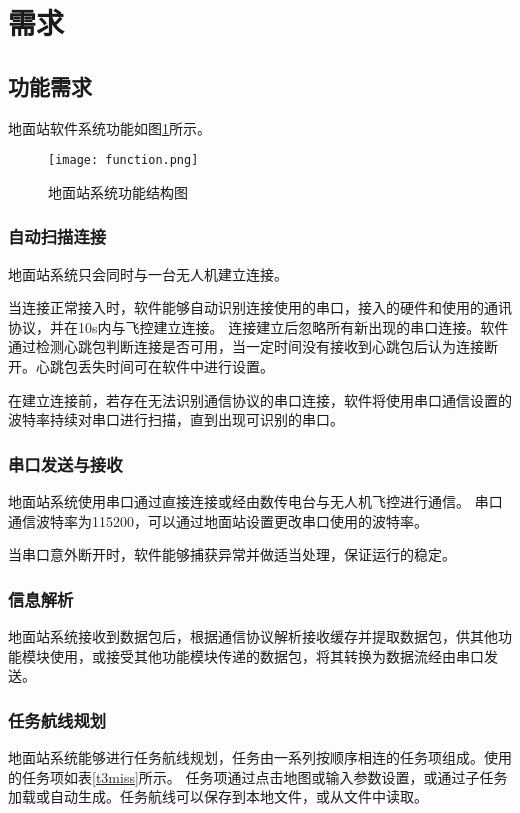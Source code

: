 \section{需求}
\subsection{功能需求}
\label{c31}
地面站软件系统功能如图\ref{f3fun}所示。
\begin{figure}[ht]
	\begin{center}
		\texttt{[image: function.png]}
		\caption{地面站系统功能结构图}
		\label{f3fun}
	\end{center}
\end{figure}

\subsubsection{自动扫描连接}
地面站系统只会同时与一台无人机建立连接。

当连接正常接入时，软件能够自动识别连接使用的串口，接入的硬件和使用的通讯协议，并在10s内与飞控建立连接。
连接建立后忽略所有新出现的串口连接。软件通过检测心跳包判断连接是否可用，当一定时间没有接收到心跳包后认为连接断开。心跳包丢失时间可在软件中进行设置。

在建立连接前，若存在无法识别通信协议的串口连接，软件将使用串口通信设置的波特率持续对串口进行扫描，直到出现可识别的串口。

\subsubsection{串口发送与接收}
地面站系统使用串口通过直接连接或经由数传电台与无人机飞控进行通信。
串口通信波特率为115200，可以通过地面站设置更改串口使用的波特率。

当串口意外断开时，软件能够捕获异常并做适当处理，保证运行的稳定。

\subsubsection{信息解析}
地面站系统接收到数据包后，根据通信协议解析接收缓存并提取数据包，供其他功能模块使用，或接受其他功能模块传递的数据包，将其转换为数据流经由串口发送。

\subsubsection{任务航线规划}
地面站系统能够进行任务航线规划，任务由一系列按顺序相连的任务项组成。使用的任务项如表\ref{t3miss}所示。
任务项通过点击地图或输入参数设置，或通过子任务加载或自动生成。任务航线可以保存到本地文件，或从文件中读取。

